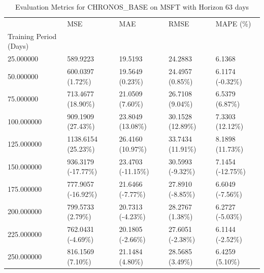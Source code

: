 \begin{table}
\caption{Evaluation Metrics for CHRONOS_BASE on MSFT with Horizon 63 days}
\label{tab:chronos_base_MSFT_h63_metrics}
\begin{tabular}{lllll}
\toprule
 & MSE & MAE & RMSE & MAPE (\%) \\
Training Period (Days) &  &  &  &  \\
\midrule
25.000000 & 589.9223 & 19.5193 & 24.2883 & 6.1368 \\
50.000000 & 600.0397 (1.72\%) & 19.5649 (0.23\%) & 24.4957 (0.85\%) & 6.1174 (-0.32\%) \\
75.000000 & 713.4677 (18.90\%) & 21.0509 (7.60\%) & 26.7108 (9.04\%) & 6.5379 (6.87\%) \\
100.000000 & 909.1909 (27.43\%) & 23.8049 (13.08\%) & 30.1528 (12.89\%) & 7.3303 (12.12\%) \\
125.000000 & 1138.6154 (25.23\%) & 26.4160 (10.97\%) & 33.7434 (11.91\%) & 8.1898 (11.73\%) \\
150.000000 & 936.3179 (-17.77\%) & 23.4703 (-11.15\%) & 30.5993 (-9.32\%) & 7.1454 (-12.75\%) \\
175.000000 & 777.9057 (-16.92\%) & 21.6466 (-7.77\%) & 27.8910 (-8.85\%) & 6.6049 (-7.56\%) \\
200.000000 & 799.5733 (2.79\%) & 20.7313 (-4.23\%) & 28.2767 (1.38\%) & 6.2727 (-5.03\%) \\
225.000000 & 762.0431 (-4.69\%) & 20.1805 (-2.66\%) & 27.6051 (-2.38\%) & 6.1144 (-2.52\%) \\
250.000000 & 816.1569 (7.10\%) & 21.1484 (4.80\%) & 28.5685 (3.49\%) & 6.4259 (5.10\%) \\
\bottomrule
\end{tabular}
\end{table}
